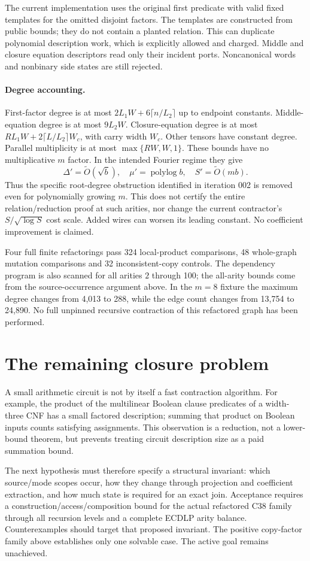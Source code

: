 \documentclass[11pt]{article}
\begin{document}
The current implementation uses the original first predicate with valid
fixed templates for the omitted disjoint factors. The templates are
constructed from public bounds; they do not contain a planted relation.
This can duplicate polynomial description work, which is explicitly
allowed and charged. Middle and closure equation descriptors read only
their incident ports. Noncanonical words and nonbinary side states are
still rejected.

\paragraph{Degree accounting.}
First-factor degree is at most
$2L_1W+6\lceil n/L_2\rceil$ up to endpoint constants.
Middle-equation degree is at most $9L_2W$.
Closure-equation degree is at most
$RL_1W+2\lceil L/L_2\rceil W_c$, with carry width $W_c$.
Other tensors have constant degree. Parallel multiplicity is at most
$\max\{RW,W,1\}$. These bounds have no multiplicative $m$ factor.
In the intended Fourier regime they give
\[
 \Delta'=\widetilde O(\sqrt b),\quad
 \mu'=\operatorname{polylog}b,\quad
 S'=\widetilde O(mb).
\]
Thus the specific root-degree obstruction identified in iteration 002
is removed even for polynomially growing $m$. This does not certify
the entire relation/reduction proof at such arities, nor change the
current contractor's $S/\sqrt{\log S}$ cost scale. Added wires can
worsen its leading constant. No coefficient improvement is claimed.

Four full finite refactorings pass 324 local-product comparisons, 48
whole-graph mutation comparisons and 32 inconsistent-copy controls.
The dependency program is also scanned for all arities $2$ through 100;
the all-arity bounds come from the source-occurrence argument above.
In the $m=8$ fixture the maximum degree changes from 4,013 to 288,
while the edge count changes from 13,754 to 24,890. No full unpinned
recursive contraction of this refactored graph has been performed.

\section{The remaining closure problem}
A small arithmetic circuit is not by itself a fast contraction algorithm.
For example, the product of the multilinear Boolean clause predicates
of a width-three CNF has a small factored description; summing that
product on Boolean inputs counts satisfying assignments. This observation
is a reduction, not a lower-bound theorem, but prevents treating circuit
description size as a paid summation bound.

The next hypothesis must therefore specify a structural invariant:
which source/mode scopes occur, how they change through projection and
coefficient extraction, and how much state is required for an exact join.
Acceptance requires a construction/access/composition bound for the actual
refactored C38 family through all recursion levels and a complete ECDLP
arity balance. Counterexamples should target that proposed invariant.
The positive copy-factor family above establishes only one solvable case.
The active goal remains unachieved.
\end{document}
